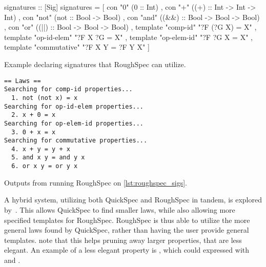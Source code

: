 \begin{listing}[H]
\begin{HaskellCode}
signatures :: [Sig]
signatures =
  [ con "0" (0 :: Int)
  , con "+" ((+) :: Int -> Int -> Int)
  , con "not" (not :: Bool -> Bool)
  , con "and" ((&&) :: Bool -> Bool -> Bool)
  , con "or" ((||) :: Bool -> Bool -> Bool)
  , template "comp-id" "?F (?G X) = X"
  , template "op-id-elem" "?F X ?G = X"
  , template "op-elem-id" "?F ?G X = X"
  , template "commutative" "?F X Y = ?F Y X"
  ]
\end{HaskellCode}
\caption{Example declaring signatures that RoughSpec can utilize.}
\label{lst:roughspec_sigs}
\end{listing}

\begin{listing}[H]
\begin{verbatim}
== Laws ==
Searching for comp-id properties...
  1. not (not x) = x
Searching for op-id-elem properties...
  2. x + 0 = x
Searching for op-elem-id properties...
  3. 0 + x = x
Searching for commutative properties...
  4. x + y = y + x
  5. and x y = and y x
  6. or x y = or y x
\end{verbatim}
\caption{Outputs from running RoughSpec on \cref{lst:roughspec_sigs}.}
\label{lst:roughspec_result}
\end{listing}

A hybrid system, utilizing both QuickSpec and RoughSpec in tandem, is explored by~\cite{Roughspec}.
This allows QuickSpec to find smaller laws, while also allowing more specified templates for RoughSpec.
RoughSpec is thus able to utilize the more general laws found by QuickSpec, rather than having the user provide general templates.
\citeauthor{Roughspec} note that this helps pruning away larger properties, that are less elegant.
An example of a less elegant property is , which could expressed with  and .
